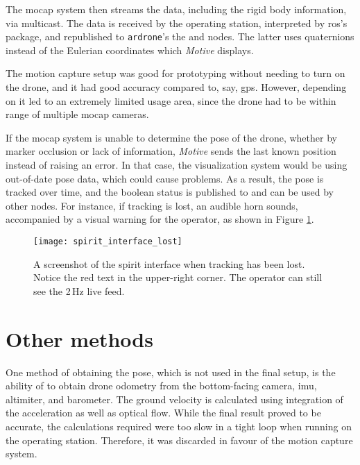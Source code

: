 
    The \gls{mocap} system then streams the data, including the rigid body information, via multicast.
    The data is received by the operating station, interpreted by \gls{ros}'s \texttt{} package, and republished to \texttt{ardrone}'s the \texttt{} and \texttt{} nodes.
    The latter uses quaternions instead of the Eulerian coordinates which \emph{Motive} displays.

    The motion capture setup was good for prototyping without needing to turn on the drone, and it had good accuracy compared to, say, \gls{gps}.
    However, depending on it led to an extremely limited usage area, since the drone had to be within range of multiple \gls{mocap} cameras.

    If the \gls{mocap} system is unable to determine the pose of the drone, whether by marker occlusion or lack of information, \emph{Motive} sends the last known position instead of raising an error.
    In that case, the visualization system would be using out-of-date pose data, which could cause problems.
    As a result, the pose is tracked over time, and the boolean status is published to \texttt{} and can be used by other nodes.
    For instance, if tracking is lost, an audible horn sounds, accompanied by a visual warning for the operator, as shown in Figure \ref{fig:spirit_interface_lost}.

    \begin{figure}[h]
      \centering
      \texttt{[image: spirit\_interface\_lost]}
      \caption[Interface with tracking lost]{A screenshot of the \gls{spirit} interface when tracking has been lost. Notice the red text in the upper-right corner. The operator can still see the 2\,Hz live feed.}
      \label{fig:spirit_interface_lost}
    \end{figure}

  \section{Other methods}
    One method of obtaining the pose, which is not used in the final setup, is the ability of \texttt{} to obtain drone odometry from the bottom-facing camera, \gls{imu}, altimiter, and barometer.
    The ground velocity is calculated using integration of the acceleration as well as optical flow.
    While the final result proved to be accurate, the calculations required were too slow in a tight loop when running on the operating station.
    Therefore, it was discarded in favour of the motion capture system.


